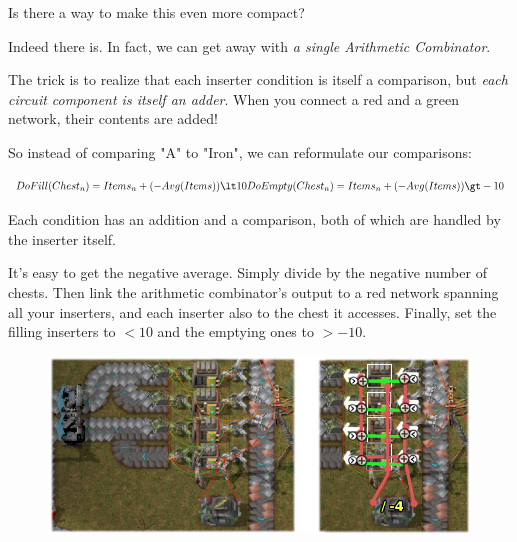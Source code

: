 \documentclass{article}
\begin{document}
Is there a way to make this even more compact?

Indeed there is. In fact, we can get away with \emph{a single Arithmetic Combinator}.

The trick is to realize that each inserter condition is itself a comparison, but \emph{each circuit component is itself an adder}. When you connect a red and a green network, their contents are added!

So instead of comparing "A" to "Iron", we can reformulate our comparisons:

$$
DoFill(Chest_n) = Items_n + (-Avg(Items)) \lt 10\\
DoEmpty(Chest_n) = Items_n + (-Avg(Items)) \gt -10
$$

Each condition has an addition and a comparison, both of which are handled by the inserter itself.

It's easy to get the negative average. Simply divide by the negative number of chests. Then link the
arithmetic combinator's output to a red network spanning all your inserters, and each inserter also to the
chest it accesses. Finally, set the filling inserters to $<10$ and the emptying ones to $>-10$.

\begin{figure}
\includegraphics{balancer.png}
\label{And that's how it works.}
\end{figure}
\end{document}
